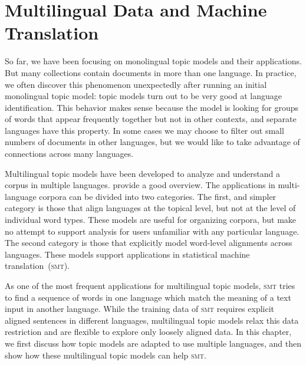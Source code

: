 \chapter{Multilingual Data and Machine Translation}
\label{ch:mt}

So far, we have been focusing on monolingual topic models and their applications.
But many collections contain documents in more than one language.
In practice, we often discover this phenomenon unexpectedly after running an initial monolingual topic model: topic models turn out to be very good at language identification.
This behavior makes sense because the model is looking for groups of
words that appear frequently together but not in other contexts, and
separate languages have this property.
In some cases we may choose to filter out small numbers of documents
in other languages, but we would like to take advantage of  connections across many languages.

Multilingual topic models have been developed to analyze and understand a corpus in multiple languages.
\citet{vulic2015probabilistic} provide a good overview.
The applications in multi-language corpora can be divided into two categories.
The first, and simpler category is those that align languages at the topical level, but not at the level of individual word types.
These models are useful for organizing corpora, but make no attempt to support analysis for users unfamiliar with any particular language.
The second category is those that explicitly model word-level alignments across languages.
These models support applications in statistical machine translation~(\textsc{smt}).

As one of the most frequent applications for multilingual topic models, \textsc{smt} tries
to find a sequence of words in one language  which match the meaning of a text input
in another language. While the training data of \textsc{smt} requires explicit aligned sentences
in different languages, multilingual topic models relax this data restriction and are flexible to 
explore only loosely aligned data.  In this chapter, we first discuss how topic models are 
adapted to use multiple languages, and then show how these multilingual topic models can 
help \textsc{smt}.

